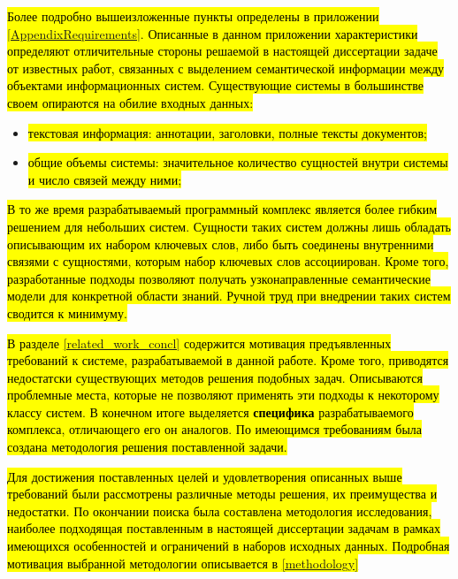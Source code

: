 \hl{Более подробно вышеизложенные пункты определены в приложении {\ref{AppendixRequirements}}. Описанные в данном приложении характеристики определяют отличительные стороны решаемой в настоящей диссертации задаче от известных работ, связанных с выделением семантической информации между объектами информационных систем. Существующие системы в большинстве своем опираются на обилие входных данных:}
\begin{itemize}
    \item \hl{текстовая информация: аннотации, заголовки, полные тексты документов;}
    \item \hl{общие объемы системы: значительное количество сущностей внутри системы и число связей между ними;}
\end{itemize}

\hl{В то же время разрабатываемый программный комплекс является более гибким решением для небольших систем. Сущности таких систем должны лишь обладать описывающим их набором ключевых слов, либо быть соединены внутренними связями с сущностями, которым набор ключевых слов ассоциирован. Кроме того, разработанные подходы позволяют получать узконаправленные семантические модели для конкретной области знаний. Ручной труд при внедрении таких систем сводится к минимуму.}

\hl{В разделе {\ref{related_work_concl}} содержится мотивация предъявленных требований к системе, разрабатываемой в данной работе. Кроме того, приводятся недостатски существующих методов решения подобных задач. Описываются проблемные места, которые не позволяют применять эти подходы к некоторому классу систем. В конечном итоге выделяется \textbf{специфика} разрабатываемого комплекса, отличающего его он аналогов. По имеющимся требованиям была создана методология решения поставленной задачи.}

{\methods} 
\hl{Для достижения поставленных целей и удовлетворения описанных выше требований были рассмотрены различные методы решения, их преимущества и недостатки. По окончании поиска была составлена методология исследования,  наиболее подходящая поставленным в настоящей диссертации задачам в рамках имеющихся особенностей и ограничений в наборов исходных данных. Подробная мотивация выбранной методологии описывается в {\ref{methodology}}}

